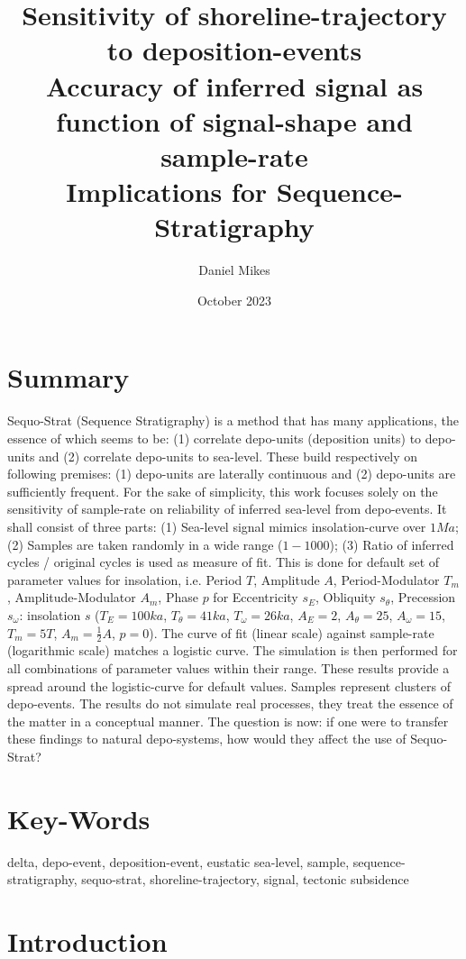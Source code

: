\documentclass[12pt]{article}
\title{
  \huge{Sensitivity of shoreline-trajectory to deposition-events} \\
  \Large{Accuracy of inferred signal as function of signal-shape and sample-rate} \\
  \large{Implications for Sequence-Stratigraphy}
}
\author{Daniel Mikes}
\date{October 2023}
\begin{document}
\maketitle

\section*{Summary}

Sequo-Strat (Sequence Stratigraphy) is a method that has many applications, the essence of which seems to be: (1) correlate depo-units (deposition units) to depo-units and (2) correlate depo-units to sea-level. These build respectively on following premises: (1) depo-units are laterally continuous and (2) depo-units are sufficiently frequent. For the sake of simplicity, this work focuses solely on the sensitivity of sample-rate on reliability of inferred sea-level from depo-events. It shall consist of three parts: (1) Sea-level signal mimics insolation-curve over $1Ma$; (2) Samples are taken randomly in a wide range ($1-1000$); (3) Ratio of inferred cycles / original cycles is used as measure of fit. This is done for default set of parameter values for insolation, i.e. Period $T$, Amplitude $A$, Period-Modulator $T_m$, Amplitude-Modulator $A_m$, Phase $p$ for Eccentricity $s_E$, Obliquity $s_\theta$, Precession $s_\omega$: insolation $s$ ($T_E=100ka$, $T_\theta=41ka$, $T_\omega=26ka$, $A_E=2$, $A_\theta=25$, $A_\omega=15$, $T_m=5T$, $A_m=\frac{1}{2}A$, $p=0$). The curve of fit (linear scale) against sample-rate (logarithmic scale) matches a logistic curve. The simulation is then performed for all combinations of parameter values within their range. These results provide a spread around the logistic-curve for default values. Samples represent clusters of depo-events. The results do not simulate real processes, they treat the essence of the matter in a conceptual manner. The question is now: if one were to transfer these findings to natural depo-systems, how would they affect the use of Sequo-Strat?

\section*{Key-Words}

delta, depo-event, deposition-event, eustatic sea-level, sample, sequence-stratigraphy, sequo-strat, shoreline-trajectory, signal, tectonic subsidence

\section*{Introduction}
\end{document}

